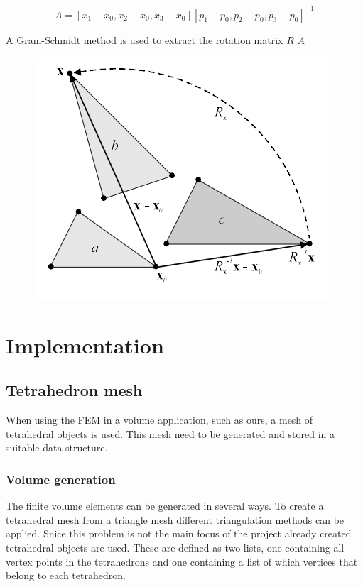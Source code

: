 \documentclass[10pt,a4paper]{article}
\begin{document}
\begin{equation}\label{eqn:stiffnessmatrix}
    A = [x_{1}-x_{0}, x_{2}-x_{0}, x_{3}-x_{0}][p_{1}-p_{0}, p_{2}-p_{0}, p_{3}-p_{0}]^{-1}
\end{equation}

A Gram-Schmidt method is used to extract the rotation matrix $R$  $A$  

\begin{figure}[h]
\centering
\includegraphics[width=.5\columnwidth]{figures/warpedstiffness.png}
\caption{}
\label{fig:4}
\end{figure}


\subsection{}


\section{Implementation}


\subsection{Tetrahedron mesh}
When using the FEM in a volume application, such as ours, a mesh of tetrahedral objects is used. This mesh need to be generated and stored in a suitable data structure.

\subsubsection{Volume generation}
The finite volume elements can be generated in several ways. To create a tetrahedral mesh from a triangle mesh different triangulation methods can be applied. Snice this problem is not the main focus of the project already created tetrahedral objects are used. These are defined as two lists, one containing all vertex points in the tetrahedrons and one containing a list of which vertices that belong to each tetrahedron.
\end{document}

